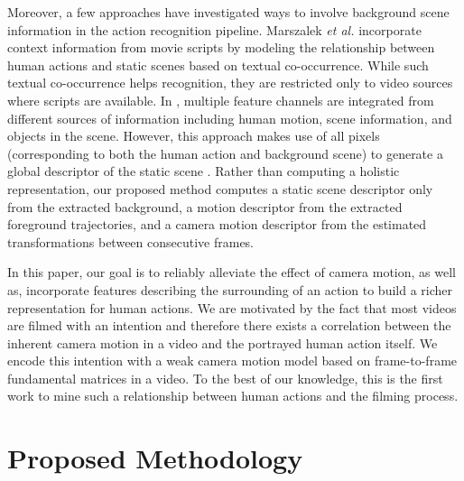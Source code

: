 \documentclass[runningheads]{llncs}
\begin{document}
Moreover, a few approaches have investigated ways to involve background scene information in the action recognition pipeline. Marszalek \emph{et al.} \cite{marszalek2009} incorporate context information from movie scripts by modeling the relationship between human actions and static scenes based on textual co-occurrence. While such textual co-occurrence helps recognition, they are restricted only to video sources where scripts are available. In \cite{ikizler2010}, multiple feature channels are integrated from different sources of information including human motion, scene information, and objects in the scene. However, this approach makes use of all pixels (corresponding to both the human action and background scene) to generate a global descriptor of the static scene \cite{oliva2001}. Rather than computing a holistic representation, our proposed method computes a static scene descriptor only from the extracted background, a motion descriptor from the extracted foreground trajectories, and a camera motion descriptor from the estimated transformations between consecutive frames.

In this paper, our goal is to reliably alleviate the effect of camera motion, as well as, incorporate features describing the surrounding of an action to build a richer representation for human actions. We are motivated by the fact that most videos are filmed with an intention and therefore there exists a correlation between the inherent camera motion in a video and the portrayed human action itself. We encode this intention with a weak camera motion model based on frame-to-frame fundamental matrices in a video. To the best of our knowledge, this is the first work to mine such a relationship between human actions and the filming process.

\section{Proposed Methodology} \label{methodology}
\end{document}
